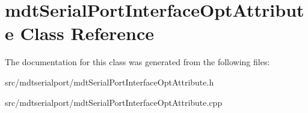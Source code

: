 \hypertarget{classmdt_serial_port_interface_opt_attribute}{
\section{mdtSerialPortInterfaceOptAttribute Class Reference}
\label{classmdt_serial_port_interface_opt_attribute}
}


The documentation for this class was generated from the following files:\begin{DoxyCompactItemize}
\item 
src/mdtserialport/mdtSerialPortInterfaceOptAttribute.h\item 
src/mdtserialport/mdtSerialPortInterfaceOptAttribute.cpp\end{DoxyCompactItemize}
